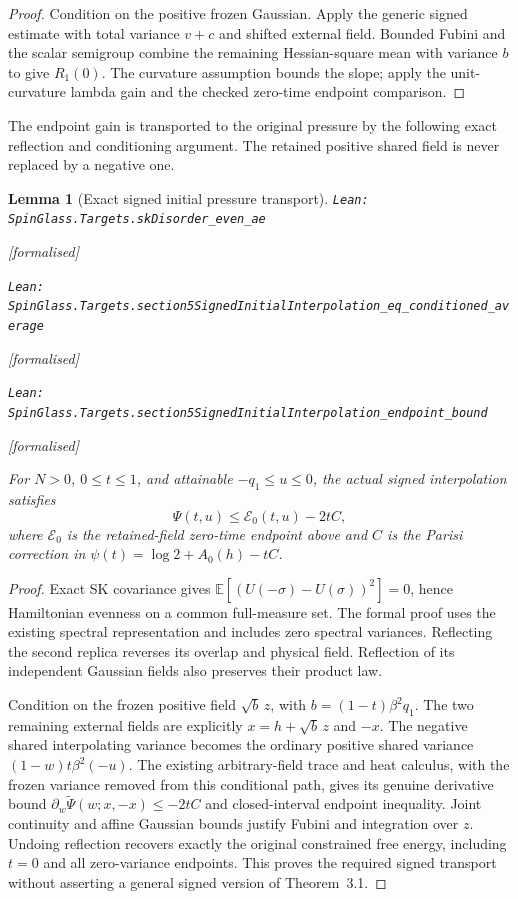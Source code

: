 \documentclass[11pt]{article}
\providecommand{\lean}[1]{\leavevmode\par\nopagebreak
  {\noindent\normalfont\footnotesize\raggedright\texttt{Lean: #1}\par}\nopagebreak}
\providecommand{\leanok}{\par\nopagebreak
  {\noindent\normalfont\footnotesize\textcolor{green!50!black}{[formalised]}\par}\nopagebreak}
\newtheorem{lemma}[theorem]{Lemma}
\newcommand{\E}{\mathbb{E}}
\begin{document}
\begin{proof}
Condition on the positive frozen Gaussian. Apply the generic signed estimate
with total variance $v+c$ and shifted external field. Bounded Fubini and the
scalar semigroup combine the remaining Hessian-square mean with variance $b$
to give $R_1(0)$. The curvature assumption bounds the slope; apply the
unit-curvature lambda gain and the checked zero-time endpoint comparison.
\end{proof}
The endpoint gain is transported to the original pressure by the following
exact reflection and conditioning argument. The retained positive shared
field is never replaced by a negative one.

\begin{lemma}[Exact signed initial pressure transport]
\lean{SpinGlass.Targets.skDisorder\_even\_ae}\leanok
\lean{SpinGlass.Targets.section5SignedInitialInterpolation\_eq\_conditioned\_average}\leanok
\lean{SpinGlass.Targets.section5SignedInitialInterpolation\_endpoint\_bound}\leanok
For $N>0$, $0\le t\le1$, and attainable $-q_1\le u\le0$, the actual
signed interpolation satisfies
\[
 \Psi(t,u)\le \mathcal E_0(t,u)-2tC,
\]
where $\mathcal E_0$ is the retained-field zero-time endpoint above and $C$
is the Parisi correction in $\psi(t)=\log2+A_0(h)-tC$.
\end{lemma}
\begin{proof}
Exact SK covariance gives
$\E[(U(-\sigma)-U(\sigma))^2]=0$, hence Hamiltonian evenness on a common
full-measure set. The formal proof uses the existing spectral representation
and includes zero spectral variances. Reflecting the second replica reverses
its overlap and physical field. Reflection of its independent Gaussian fields
also preserves their product law.

Condition on the frozen positive field $\sqrt b\,z$, with
$b=(1-t)\beta^2q_1$. The two remaining external fields are explicitly
$x=h+\sqrt b\,z$ and $-x$. The negative shared interpolating variance becomes
the ordinary positive shared variance $(1-w)t\beta^2(-u)$.
The existing arbitrary-field trace and heat calculus, with the frozen variance
removed from this conditional path, gives its genuine derivative bound
$\partial_w\widetilde\Psi(w;x,-x)\le-2tC$ and closed-interval endpoint
inequality. Joint continuity and affine Gaussian bounds justify Fubini and
integration over $z$. Undoing reflection recovers exactly the original
constrained free energy, including $t=0$ and all zero-variance endpoints.
This proves the required signed transport without asserting a general signed
version of Theorem~3.1.
\end{proof}
\end{document}
